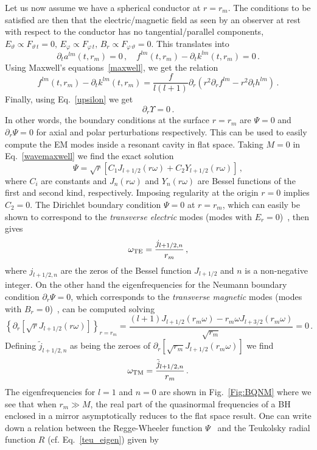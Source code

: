 \documentclass[11pt]{article}
\newcommand{\be}{\begin{equation}}
\newcommand{\ee}{\end{equation}}
\numberwithin{equation}{section} %
\begin{document}
Let us now assume we have a spherical conductor at $r=r_m$. The conditions to be satisfied are then that the electric/magnetic field as seen by an observer at rest with respect to the conductor has no tangential/parallel components, $E_{\vartheta}\propto F_{\vartheta \,t}=0,\,E_{\varphi}\propto F_{\varphi \,t},\,B_{r}\propto F_{\varphi \,\vartheta}=0$.
This translates into
%
\be
\partial_t a^{lm}(t,r_m)=0\,,\quad f^{lm}(t,r_m)-\partial_t k^{lm}(t,r_m)=0\,.
\ee
%
Using Maxwell's equations~\eqref{maxwell}, we get the relation
%
\be
f^{lm}(t,r_m)-\partial_t k^{lm}(t,r_m)=\frac{f}{l(l+1)}\partial_r\left(r^2\partial_r f^{lm}-r^2\partial_t h^{lm}\right)\,.
\ee
%
Finally, using Eq.~\eqref{upsilon} we get
%
\be
\partial_r\Upsilon=0\,.
\ee
%
In other words, the boundary conditions at the surface $r=r_m$ are $\Psi=0$ and $\partial_r\Psi=0$ for axial and polar 
perturbations respectively. This can be used to easily compute the EM modes inside a resonant cavity in flat space. 
Taking $M=0$ in Eq.~\eqref{wavemaxwell} we find the exact solution
%
\be
\Psi=\sqrt{r}\left[C_1 J_{l+1/2}(r \omega)+C_2 Y_{l+1/2}(r \omega)\right]\,,
\ee
where $C_{i}$ are constants and $J_n(r\omega)$ and $Y_n(r\omega)$ are Bessel functions of the first and second kind, respectively. Imposing regularity at the origin $r=0$ implies $C_2=0$. The Dirichlet boundary condition $\Psi=0$ at $r=r_m$, which can easily be shown to correspond to the \emph{transverse electric} modes (modes with $E_r=0$)~\cite{Jackson}, then gives
%
\be\label{TE_modes}
\omega_{\rm TE}=\frac{j_{l+1/2,n}}{r_m}\,,
\ee
% 
where $j_{l+1/2,n}$ are the zeros of the Bessel function $J_{l+1/2}$ and $n$ is a non-negative integer. On the other hand the eigenfrequencies for the Neumann boundary condition $\partial_r\Psi=0$, which corresponds to the \emph{transverse magnetic} modes (modes with $B_r=0$)~\cite{Jackson}, can be computed solving
%
\be
\left\{\partial_r\left[\sqrt{r}J_{l+1/2}(r\omega)\right]\right\}_{r=r_m}=\frac{(l+1)J_{l+1/2}(r_m\omega)-r_m\omega J_{l+3/2}(r_m\omega)}{\sqrt{r_m}}=0\,.
\ee
%
Defining $\tilde{j}_{l+1/2,n}$ as being the zeroes of $\partial_r\left[\sqrt{r_m}J_{l+1/2}(r_m\omega)\right]$ we find
%
\be\label{TM_modes}
\omega_{\rm TM}=\frac{\tilde{j}_{l+1/2,n}}{r_m}\,.
\ee
%
The eigenfrequencies for $l=1$ and $n=0$ are shown in Fig.~\ref{Fig:BQNM} where we see that when $r_m\gg M$, the real part of the quasinormal frequencies of a BH enclosed in a mirror asymptotically reduces to the flat space result.  
%
One can write down a relation between the Regge-Wheeler function $\Psi$~\cite{Chrzanowski:1975wv,Ori:2002uv,Hughes:2000pf} and the Teukolsky radial function $R$ (cf. Eq.~\eqref{teu_eigen}) given by
\end{document}
